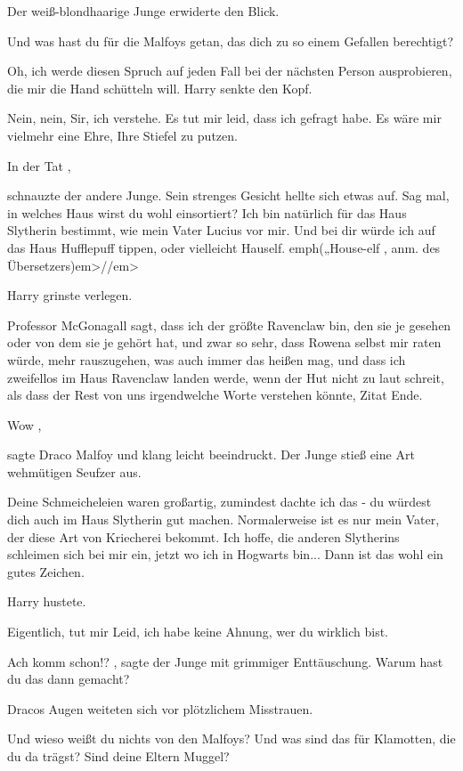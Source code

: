 Der weiß-blondhaarige
Junge erwiderte den Blick.

\glqq Und was hast du für die Malfoys getan, das dich zu so einem Gefallen
berechtigt?\grqq{}

Oh, ich werde diesen Spruch auf jeden Fall bei der nächsten Person ausprobieren, die mir
die Hand schütteln will. Harry senkte den Kopf.

\glqq Nein, nein, Sir, ich verstehe. Es tut mir leid, dass
ich gefragt habe. Es wäre mir vielmehr eine Ehre, Ihre Stiefel zu putzen.\grqq{}

\glqq In der Tat\grqq{} ,

schnauzte der andere Junge. Sein strenges Gesicht hellte sich etwas auf.
\glqq Sag mal, in welches Haus
wirst du wohl einsortiert? Ich bin natürlich für das Haus Slytherin bestimmt, wie mein Vater Lucius vor mir. Und bei dir
würde ich auf das Haus Hufflepuff tippen, oder vielleicht Hauself. emph{(„House-elf\grqq{} , anm. des Übersetzers)em>/}/em>

Harry grinste verlegen.

\glqq Professor McGonagall sagt, dass ich der größte Ravenclaw bin, den
sie je gesehen oder von dem sie je gehört hat, und zwar so sehr, dass Rowena selbst mir raten würde, mehr rauszugehen,
was auch immer das heißen mag, und dass ich zweifellos im Haus Ravenclaw landen werde, wenn der Hut nicht zu laut
schreit, als dass der Rest von uns irgendwelche Worte verstehen könnte, Zitat Ende.\grqq{}

\glqq Wow\grqq{} ,

sagte Draco Malfoy und klang leicht beeindruckt. Der Junge stieß eine Art wehmütigen Seufzer aus.

\glqq Deine Schmeicheleien waren großartig, zumindest dachte ich das - du würdest dich auch im Haus
Slytherin gut machen. Normalerweise ist es nur mein Vater, der diese Art von Kriecherei bekommt. Ich hoffe, die anderen
Slytherins schleimen sich bei mir ein, jetzt wo ich in Hogwarts bin... Dann ist das wohl ein gutes
Zeichen.\grqq{}

Harry hustete.

\glqq Eigentlich, tut mir Leid, ich habe keine Ahnung, wer du
wirklich bist.\grqq{}

\glqq Ach komm schon!?\grqq{} , sagte der Junge mit grimmiger Enttäuschung. \glqq Warum
hast du das dann gemacht?\grqq{}

Dracos Augen weiteten sich vor plötzlichem Misstrauen.

\glqq Und
wieso weißt du nichts von den Malfoys? Und was sind das für Klamotten, die du da trägst? Sind deine Eltern Muggel?\grqq{}

